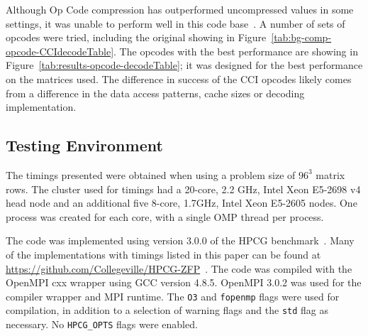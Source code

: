 Although Op Code compression has outperformed uncompressed values in some settings, it was unable to perform well in this code base~\cite{Lawlor:2013:compression}.
A number of sets of opcodes were tried, including the original showing in Figure~\ref{tab:bg-comp-opcode-CCIdecodeTable}.
The opcodes with the best performance are showing in Figure~\ref{tab:results-opcode-decodeTable}; it was designed for the best performance on the matrices used.
The difference in success of the CCI opcodes likely comes from a difference in the data access patterns, cache sizes or decoding implementation.



\subsection{Testing Environment}
The timings presented were obtained when using a problem size of \(96^3\) matrix rows.
The cluster used for timings had a 20-core, 2.2 GHz, Intel Xeon E5-2698 v4 head node and an additional five 8-core, 1.7GHz, Intel Xeon E5-2605 nodes.
One process was created for each core, with a single OMP thread per process.

The code was implemented using version 3.0.0 of the HPCG benchmark~\cite{Dongarra:2015:HPCG}.
Many of the implementations with timings listed in this paper can be found at \url{https://github.com/Collegeville/HPCG-ZFP}~\cite{Lindquist:2018:projectGithub}.
The code was compiled with the OpenMPI cxx wrapper using GCC version 4.8.5.
OpenMPI 3.0.2 was used for the compiler wrapper and MPI runtime.
The \texttt{O3} and \texttt{fopenmp} flags were used for compilation, in addition to a selection of warning flags and the \texttt{std} flag as necessary.
No \texttt{HPCG\_OPTS} flags were enabled.